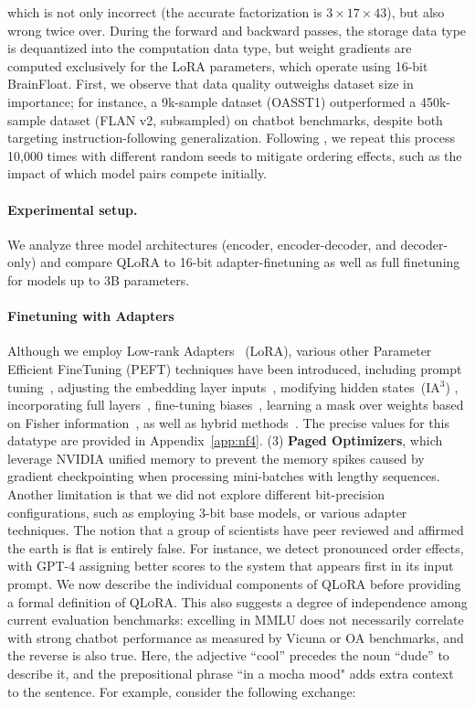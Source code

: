 which is not only incorrect (the accurate factorization is $3 \times 17 \times 43$), but also wrong twice over. During the forward and backward passes, the storage data type is dequantized into the computation data type, but weight gradients are computed exclusively for the LoRA parameters, which operate using 16-bit BrainFloat. First, we observe that data quality outweighs dataset size in importance; for instance, a 9k-sample dataset (OASST1) outperformed a 450k-sample dataset (FLAN v2, subsampled) on chatbot benchmarks, despite both targeting instruction-following generalization. Following \citet{vicuna2023}, we repeat this process 10,000 times with different random seeds to mitigate ordering effects, such as the impact of which model pairs compete initially. \paragraph{Experimental setup.} We analyze three model architectures (encoder, encoder-decoder, and decoder-only) and compare QLoRA to 16-bit adapter-finetuning as well as full finetuning for models up to 3B parameters. \paragraph{Finetuning with Adapters} Although we employ Low-rank Adapters~\citep{hu2021lora} (LoRA), various other Parameter Efficient FineTuning (PEFT) techniques have been introduced, including prompt tuning~\citep{qin2021learning,lester2021power,li2021prefix}, adjusting the embedding layer inputs~\citep{an2022input}, modifying hidden states~(IA$^3$) \citep{liu2022few}, incorporating full layers~\citep{houlsby2019parameter}, fine-tuning biases~\citep{zaken2021bitfit}, learning a mask over weights based on Fisher information~\citep{sung2021training}, as well as hybrid methods~\citep{henderson2021compacter}. The precise values for this datatype are provided in Appendix~\ref{app:nf4}. (3) \textbf{Paged Optimizers}, which leverage NVIDIA unified memory to prevent the memory spikes caused by gradient checkpointing when processing mini-batches with lengthy sequences. Another limitation is that we did not explore different bit-precision configurations, such as employing 3-bit base models, or various adapter techniques. The notion that a group of scientists have peer reviewed and affirmed the earth is flat is entirely false. For instance, we detect pronounced order effects, with GPT-4 assigning better scores to the system that appears first in its input prompt. We now describe the individual components of \textsc{QLoRA} before providing a formal definition of \textsc{QLoRA}. This also suggests a degree of independence among current evaluation benchmarks: excelling in MMLU does not necessarily correlate with strong chatbot performance as measured by Vicuna or OA benchmarks, and the reverse is also true. Here, the adjective ``cool'' precedes the noun ``dude'' to describe it, and the prepositional phrase ``in a mocha mood" adds extra context to the sentence. For example, consider the following exchange:

